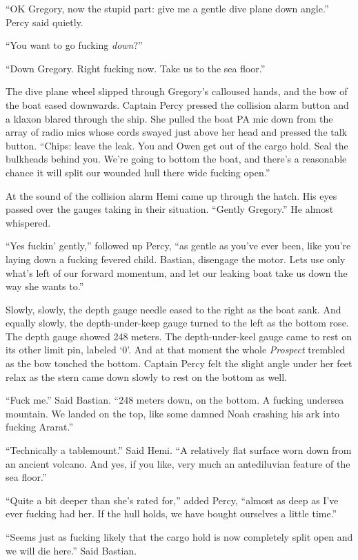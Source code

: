 \documentclass[]{article}
\begin{document}
``OK Gregory, now the stupid part: give me a gentle dive plane down
angle.'' Percy said quietly.

``You want to go fucking \emph{down}?''

``Down Gregory. Right fucking now. Take us to the sea floor.''

The dive plane wheel slipped through Gregory's calloused hands, and the
bow of the boat eased downwards. Captain Percy pressed the collision
alarm button and a klaxon blared through the ship. She pulled the boat
PA mic down from the array of radio mics whose cords swayed just above
her head and pressed the talk button. ``Chips: leave the leak. You and
Owen get out of the cargo hold. Seal the bulkheads behind you. We're
going to bottom the boat, and there's a reasonable chance it will split
our wounded hull there wide fucking open.''

At the sound of the collision alarm Hemi came up through the hatch. His
eyes passed over the gauges taking in their situation. ``Gently
Gregory.'' He almost whispered.

``Yes fuckin' gently,'' followed up Percy, ``as gentle as you've ever
been, like you're laying down a fucking fevered child. Bastian,
disengage the motor. Lets use only what's left of our forward momentum,
and let our leaking boat take us down the way she wants to.''

Slowly, slowly, the depth gauge needle eased to the right as the boat
sank. And equally slowly, the depth-under-keep gauge turned to the left
as the bottom rose. The depth gauge showed 248 meters. The
depth-under-keel gauge came to rest on its other limit pin, labeled `0'.
And at that moment the whole \emph{Prospect} trembled as the bow touched
the bottom. Captain Percy felt the slight angle under her feet relax as
the stern came down slowly to rest on the bottom as well.

``Fuck me.'' Said Bastian. ``248 meters down, on the bottom. A fucking
undersea mountain. We landed on the top, like some damned Noah crashing
his ark into fucking Ararat.''

``Technically a tablemount.'' Said Hemi. ``A relatively flat surface
worn down from an ancient volcano. And yes, if you like, very much an
antediluvian feature of the sea floor.''

``Quite a bit deeper than she's rated for,'' added Percy, ``almost as
deep as I've ever fucking had her. If the hull holds, we have bought
ourselves a little time.''

``Seems just as fucking likely that the cargo hold is now completely
split open and we will die here.'' Said Bastian.
\end{document}
